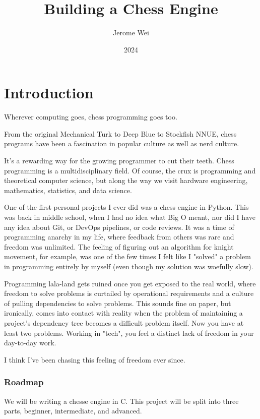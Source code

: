 \documentclass{article}
\title{Building a Chess Engine}
\author{Jerome Wei}
\date{2024}
\begin{document}
\maketitle
\newpage
\tableofcontents

\newpage
\part{Introduction}
Wherever computing goes, chess programming goes too.

From the original Mechanical Turk to Deep Blue to Stockfish NNUE, chess programs have been a fascination in popular culture as well as nerd culture.

It's a rewarding way for the growing programmer to cut their teeth. Chess programming is a multidisciplinary field. Of course, the crux is programming and theoretical computer science, but along the way we visit hardware engineering, mathematics, statistics, and data science.

One of the first personal projects I ever did was a chess engine in Python. This was back in middle school, when I had no idea what Big O meant, nor did I have any idea about Git, or DevOps pipelines, or code reviews. It was a time of programming anarchy in my life, where feedback from others was rare and freedom was unlimited. The feeling of figuring out an algorithm for knight movement, for example, was one of the few times I felt like I "solved" a problem in programming entirely by myself (even though my solution was woefully slow).

Programming lala-land gets ruined once you get exposed to the real world, where freedom to solve problems is curtailed by operational requirements and a culture of pulling dependencies to solve problems. This sounds fine on paper, but ironically, comes into contact with reality when the problem of maintaining a project's dependency tree becomes a difficult problem itself. Now you have at least two problems. Working in "tech", you feel a distinct lack of freedom in your day-to-day work.

I think I've been chasing this feeling of freedom ever since.

\section{Roadmap}

We will be writing a chesse engine in C. This project will be split into three parts, beginner, intermediate, and advanced.
\end{document}
